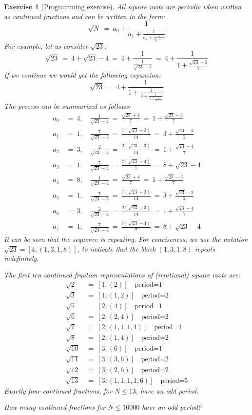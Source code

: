 \documentclass[11pt]{amsart}
\theoremstyle{theorem}
\newtheorem{exercise}{Exercise}
\begin{document}
\begin{exercise}[Programming exercise]
All square roots are periodic when written as continued fractions and can be written in the form:
\[
\sqrt{N} \ = \ a_0+\frac{1}{a_1+\frac{1}{a_2+\frac{1}{a_3+\cdots}}}
\]
For example, let us consider $\sqrt{23}$:
\[
\sqrt{23} \ = \ 4+\sqrt{23}-4 \ = \ 4+\frac{1}{\frac{1}{\sqrt{23}-4}} \ = \ 4+\frac{1}{1+\frac{\sqrt{23}-3}{7}}
\]
If we continue we would get the following expansion:
\[
\sqrt{23} \ = \ 4+\frac{1}{1+\frac{1}{3+\frac{1}{1+\frac{1}{8+\cdots}}}}
\]
The process can be summarized as follows:
\begin{align*}
a_0 \ &= \ 4,\quad\frac{1}{\sqrt{23}-4} \ = \ \frac{\sqrt{23}+4}{7} \ = \ 1+\frac{\sqrt{23}-3}{7} \\
a_1 \ &= \ 1,\quad \frac{7}{\sqrt{23}-3} \ = \ \frac{7(\sqrt{23}+3)}{14} \ = \ 3+\frac{\sqrt{23}-3}{2} \\
a_2 \ &= \ 3,\quad \frac{2}{\sqrt{23}-3} \ = \ \frac{2(\sqrt{23}+3)}{14} \ = \ 1+\frac{\sqrt{23}-4}{7} \\
a_3 \ &= \ 1,\quad \frac{7}{\sqrt{23}-4} \ = \ \frac{7(\sqrt{23}+4)}{7} \ = \ 8+\sqrt{23}-4 \\
a_4 \ &= \ 8,\quad\frac{1}{\sqrt{23}-4} \ = \ \frac{\sqrt{23}+4}{7} \ = \ 1+\frac{\sqrt{23}-3}{7} \\
a_5 \ &= \ 1,\quad\frac{7}{\sqrt{23}-3} \ = \ \frac{7(\sqrt{23}+3)}{14} \ = \ 3+\frac{\sqrt{23}-3}{2} \\
a_6 \ &= \ 3,\quad \frac{2}{\sqrt{23}-3} \ = \ \frac{2(\sqrt{23}+3)}{14} \ = \ 1+\frac{\sqrt{23}-4}{7} \\
a_7 \ &= \ 1,\quad \frac{7}{\sqrt{23}-4} \ = \ \frac{7(\sqrt{23}+4)}{7} \ = \ 8+\sqrt{23}-4
\end{align*}
It can be seen that the sequence is repeating. For conciseness, we use the notation $\sqrt{23} = [4;(1,3,1,8)]$, to indicate that the block $(1,3,1,8)$ repeats indefinitely.

The first ten continued fraction representations of (irrational) square roots are:
\begin{align*}
\sqrt{2} \ &= \ [1;(2)]\quad\text{period=1} \\
\sqrt{3} \ &= \ [1;(1,2)]\quad\text{period=2} \\
\sqrt{5} \ &= \ [2;(4)] \quad\text{period=1} \\
\sqrt{6} \ &= \ [2;(2,4)]\quad\text{period=2} \\
\sqrt{7} \ &= \ [2;(1,1,1,4)]\quad\text{period=4} \\
\sqrt{8} \ &= \ [2;(1,4)]\quad\text{period=2} \\
\sqrt{10} \ &= \  [3;(6)]\quad\text{period=1} \\
\sqrt{11} \ &= \ [3;(3,6)]\quad\text{period=2} \\
\sqrt{12} \ &= \ [3;(2,6)]\quad\text{period=2} \\
\sqrt{13} \ &= \ [3;(1,1,1,1,6)]\quad\text{period=5}
\end{align*}
Exactly four continued fractions, for $N\leq 13$, have an odd period.

How many continued fractions for $N\leq 10000$ have an odd period?
\end{exercise}
\end{document}
